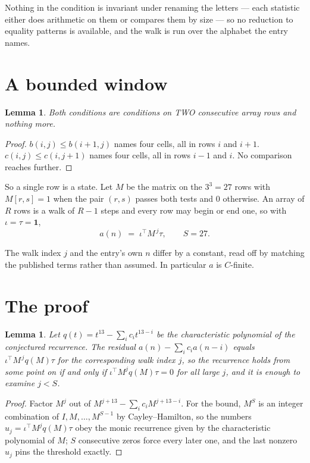 \documentclass[11pt,a4paper]{article}
\theoremstyle{plain}
\newtheorem{lemma}[theorem]{Lemma}
\theoremstyle{definition}
\begin{document}
Nothing in the condition is invariant under renaming the letters --- each statistic either does
arithmetic on them or compares them by size --- so no reduction to equality patterns is
available, and the walk is run over the alphabet the entry names.

\section{A bounded window}

\begin{lemma}\label{lem:win}
Both conditions are conditions on TWO consecutive array rows and nothing more.
\end{lemma}

\begin{proof}
$b(i,j)\le b(i{+}1,j)$ names four cells, all in rows $i$ and $i+1$. $c(i,j)\le c(i,j{+}1)$
names four cells, all in rows $i-1$ and $i$. No comparison reaches further.
\end{proof}

So a single row is a state. Let $M$ be the matrix on the $3^{3}=27$ rows with
$M[r,s]=1$ when the pair $(r,s)$ passes both tests and $0$ otherwise. An array of $R$ rows is a
walk of $R-1$ steps and every row may begin or end one, so with $\iota=\tau=\mathbf{1}$,
\[
a(n)\;=\;\iota^{\!\top}M^{\,j}\tau ,\qquad S=27.
\]

The walk index $j$ and the entry's own $n$ differ by a constant, read off by matching the
published terms rather than assumed. In particular $a$ is $C$-finite.

\section{The proof}

\begin{lemma}\label{lem:crit}
Let $q(t)=t^{13}-\sum_i c_it^{13-i}$ be the characteristic polynomial of the
conjectured recurrence. The residual $a(n)-\sum_ic_ia(n-i)$ equals
$\iota^{\!\top}M^{\,j}q(M)\tau$ for the corresponding walk index $j$, so the recurrence
holds from some point on if and only if $\iota^{\!\top}M^{j}q(M)\tau=0$ for all large $j$,
and it is enough to examine $j<S$.
\end{lemma}

\begin{proof}
Factor $M^{j}$ out of $M^{j+13}-\sum_ic_iM^{j+13-i}$. For the bound, $M^{S}$
is an integer combination of $I,M,\dots,M^{S-1}$ by Cayley--Hamilton, so the numbers
$u_j=\iota^{\!\top}M^{j}q(M)\tau$ obey the monic recurrence given by the characteristic
polynomial of $M$; $S$ consecutive zeros force every later one, and the last nonzero $u_j$
pins the threshold exactly.
\end{proof}
\end{document}

